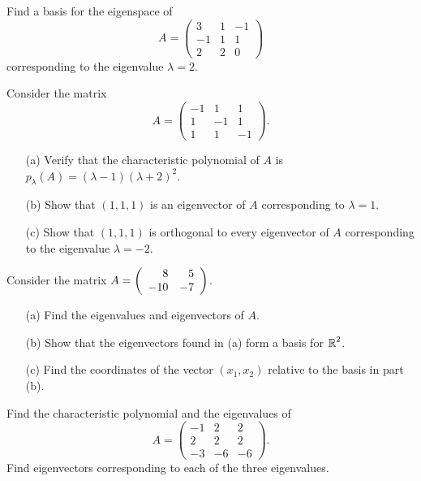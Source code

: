\documentclass{ximera}
\begin{document}
\begin{exercise} \label{c10.2.2}
Find a basis for the eigenspace of 
\[
A = \left(\begin{array}{rrr} 3 & 1 & -1 \\ -1 & 1 & 1 \\ 2 & 2 & 0 
\end{array}\right)
\]
corresponding to the eigenvalue $\lambda=2$.
\end{exercise}

\begin{exercise} \label{c10.2.3}
Consider the matrix  
\[
A = \left(\begin{array}{rrr} -1 & 1 & 1 \\ 1 & -1 & 1 \\ 1 & 1 & -1 
\end{array}\right).
\]
\begin{itemize}
\item[(a)] Verify that the characteristic polynomial of $A$ is
 $p_\lambda(A)=(\lambda-1)(\lambda+2)^2$.
\item[(b)] Show that $(1,1,1)$ is an eigenvector of $A$ corresponding to 
$\lambda=1$.
\item[(c)] Show that $(1,1,1)$ is orthogonal to every eigenvector 
of $A$ corresponding to the eigenvalue $\lambda=-2$.
\end{itemize}
\end{exercise}

\begin{exercise} \label{c10.2.4}
Consider the matrix $A=\left(\begin{array}{rr} 8 & 5\\ -10 &-7\end{array}\right)$.
\begin{itemize}
\item[(a)] Find the eigenvalues and eigenvectors of $A$.
\item[(b)] Show that the eigenvectors found in (a) form a basis for $\mbox{$\Bbb{R}$}^2$.
\item[(c)] Find the coordinates of the vector $(x_1,x_2)$ relative to the 
basis in part (b).
\end{itemize}
\end{exercise}

\begin{exercise} \label{c10.2.5}
Find the characteristic polynomial and the eigenvalues of 
\[
A = \left(\begin{array}{rrr} -1 & 2 & 2 \\ 2 & 2 & 2 \\ -3 & -6 & -6 
\end{array}\right).
\]
Find eigenvectors corresponding to each of the three eigenvalues.
\end{exercise}
\end{document}
